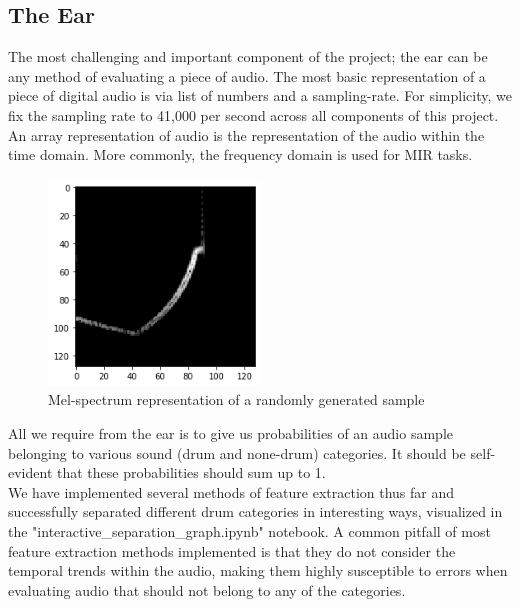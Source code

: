 \documentclass{article}
\begin{document}
\subsection{The Ear}
The most challenging and important component of the project; the ear can be any method of evaluating a piece of audio. The most basic representation of a piece of digital audio is via list of numbers and a sampling-rate. For simplicity, we fix the sampling rate to 41,000 per second across all components of this project. An array representation of audio is the representation of the audio within the time domain. More commonly, the frequency domain is used for MIR tasks.

\begin{figure}[h!]
\centering
\includegraphics[width=0.5\textwidth]{images/specplot.png}
\caption{Mel-spectrum representation of a randomly generated sample}
\label{fig:SSS generator}
\end{figure}
All we require from the ear is to give us probabilities of an audio sample belonging to various sound (drum and none-drum) categories. It should be self-evident that these probabilities should sum up to 1.\\

We have implemented several methods of feature extraction thus far and successfully separated different drum categories in interesting ways, visualized in the "interactive\_separation\_graph.ipynb" notebook. A common pitfall of most feature extraction methods implemented is that they do not consider the temporal trends within the audio, making them highly susceptible to errors when evaluating audio that should not belong to any of the categories.\\
\end{document}
